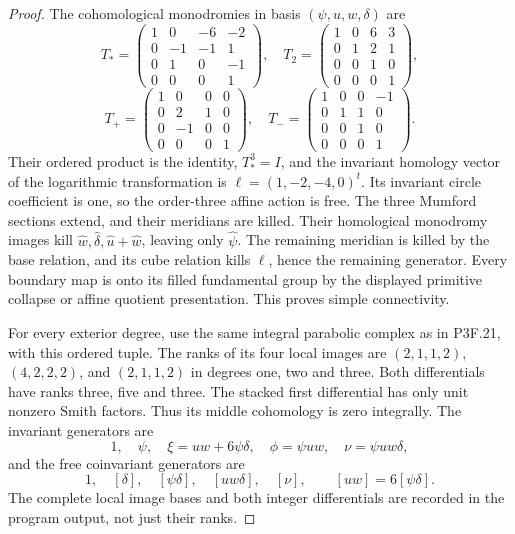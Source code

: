 \begin{proof}
The cohomological monodromies in basis \((\psi,u,w,\delta)\) are \[
 T_* =\begin{pmatrix}1&0&-6&-2\\0&-1&-1&1\\0&1&0&-1\\0&0&0&1\end{pmatrix},\quad
 T_2=\begin{pmatrix}1&0&6&3\\0&1&2&1\\0&0&1&0\\0&0&0&1\end{pmatrix},
\] \[
 T_+=\begin{pmatrix}1&0&0&0\\0&2&1&0\\0&-1&0&0\\0&0&0&1\end{pmatrix},\quad
 T_-=\begin{pmatrix}1&0&0&-1\\0&1&1&0\\0&0&1&0\\0&0&0&1\end{pmatrix}.
\] Their ordered product is the identity, \(T_*^3=I\), and the invariant homology vector of the logarithmic transformation is \(\ell=(1,-2,-4,0)^t\). Its invariant circle coefficient is one, so the order-three affine action is free. The three Mumford sections extend, and their meridians are killed. Their homological monodromy images kill \(\widehat w,\widehat\delta,\widehat u+\widehat w\), leaving only \(\widehat\psi\). The remaining meridian is killed by the base relation, and its cube relation kills \(\ell\), hence the remaining generator. Every boundary map is onto its filled fundamental group by the displayed primitive collapse or affine quotient presentation. This proves simple connectivity.

For every exterior degree, use the same integral parabolic complex as in P3F.21, with this ordered tuple. The ranks of its four local images are \((2,1,1,2)\), \((4,2,2,2)\), and \((2,1,1,2)\) in degrees one, two and three. Both differentials have ranks three, five and three. The stacked first differential has only unit nonzero Smith factors. Thus its middle cohomology is zero integrally. The invariant generators are \[
 1,\quad\psi,\quad\xi=uw+6\psi\delta,\quad\phi=\psi uw,\quad\nu=\psi uw\delta,
\] and the free coinvariant generators are \[
 1,\quad[\delta],\quad[\psi\delta],\quad[uw\delta],\quad[\nu],
 \qquad[uw]=6[\psi\delta].
\] The complete local image bases and both integer differentials are recorded in the program output, not just their ranks.


\end{proof}
